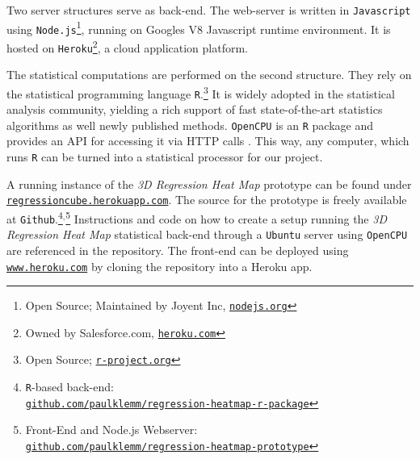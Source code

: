 \documentclass[journal]{style/vgtc} 			          %
\begin{document}
Two server structures serve as back-end.
The web-server is written in \texttt{Javascript} using \texttt{Node.js}\footnote{Open Source; Maintained by Joyent Inc, \href{http://nodejs.org}{\texttt{nodejs.org}}}, running on Googles V8 Javascript runtime environment.
It is hosted on \texttt{Heroku}\footnote{Owned by Salesforce.com, \href{https://www.heroku.com/}{\texttt{heroku.com}}}, a cloud application platform.

The statistical computations are performed on the second structure.
They rely on the statistical programming language \texttt{R}.\footnote{Open Source; \href{http://r-project.org}{\texttt{r-project.org}}}
It is widely adopted in the statistical analysis community, yielding a rich support of fast state-of-the-art statistics algorithms as well newly published methods.
\texttt{OpenCPU} is an \texttt{R} package and provides an API for accessing it via HTTP calls \cite{Ooms}.
This way, any computer, which runs \texttt{R} can be turned into a statistical processor for our project.

A running instance of the \emph{3D Regression Heat Map} prototype can be found under \href{http://regressioncube.herokuapp.com/}{\texttt{regressioncube.herokuapp.com}}.
The source for the prototype is freely available at \texttt{Github}.\footnote{\texttt{R}-based back-end: \href{https://github.com/paulklemm/regression-heatmap-r-package}{\\\texttt{github.com/paulklemm/regression-heatmap-r-package}}}$^{,}$\footnote{Front-End and Node.js Webserver: \href{https://github.com/paulklemm/regression-heatmap-prototype}{\texttt{\\github.com/paulklemm/regression-heatmap-prototype}}}
Instructions and code on how to create a setup running the \emph{3D Regression Heat Map} statistical back-end through a \texttt{Ubuntu} server using \texttt{OpenCPU} are referenced in the repository.
The front-end can be deployed using \href{https://www.heroku.com/}{\texttt{www.heroku.com}} by cloning the repository into a Heroku app.
\end{document}
